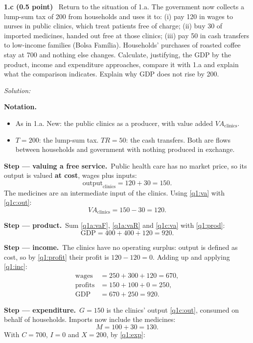 \documentclass[11pt,a4paper]{article}
\newif\ifsolucoes
\newcommand{\sub}[2]{\Needspace{8\baselineskip}\par\medskip\noindent\textbf{#1 (#2)}~}
\newcommand{\resolespaco}[1][6cm]{\ifsolucoes\else\par\textit{Solution:}\vspace{#1}\par\fi}
\newcommand{\passo}[2]{\par\smallskip\noindent\textbf{Step --- #1.}~#2}
\newenvironment{notacao}{\par\smallskip\noindent\textbf{Notation.}\begin{itemize}[leftmargin=1.4em,topsep=1pt,itemsep=0pt]\small}{\end{itemize}}
\begin{document}
\sub{1.c}{0.5 point} Return to the situation of 1.a. The government now collects a lump-sum tax
of 200 from households and uses it to: (i) pay 120 in wages to nurses in public clinics, which treat
patients free of charge; (ii) buy 30 of imported medicines, handed out free at those clinics;
(iii) pay 50 in cash transfers to low-income families (Bolsa Fam\'ilia). Households' purchases of
roasted coffee stay at 700 and nothing else changes. Calculate, justifying, the GDP by the product,
income and expenditure approaches, compare it with 1.a and explain what the comparison indicates.
Explain why GDP does not rise by 200.
\resolespaco[6.5cm]
\begin{sol}
\begin{notacao}
\item As in 1.a. New: the public clinics as a producer, with value added $VA_{\text{clinics}}$.
\item $T=200$: the lump-sum tax. $TR=50$: the cash transfers. Both are flows between households and
government with nothing produced in exchange.
\end{notacao}
\passo{valuing a free service}{Public health care has no market price, so its output is valued
\textbf{at cost}, wages plus inputs:}
\begin{equation}
\text{output}_{\text{clinics}}=120+30=150. \label{q1c:out}
\end{equation}
The medicines are an intermediate input of the clinics. Using \eqref{q1:va} with \eqref{q1c:out}:
\begin{equation}
VA_{\text{clinics}}=150-30=120. \label{q1c:va}
\end{equation}
\passo{product}{Sum \eqref{q1a:vaF}, \eqref{q1a:vaR} and \eqref{q1c:va} with \eqref{q1:prod}:}
\begin{equation}
\text{GDP}=400+400+120=\boxed{920}. \label{q1c:gdp}
\end{equation}
\passo{income}{The clinics have no operating surplus: output is defined as cost, so by
\eqref{q1:profit} their profit is $120-120=0$. Adding up and applying \eqref{q1:inc}:}
\begin{align*}
\text{wages} &= 250+300+120=670,\\
\text{profits} &= 150+100+0=250,\\
\text{GDP} &= 670+250=\boxed{920}.
\end{align*}
\passo{expenditure}{$G=150$ is the clinics' output \eqref{q1c:out}, consumed on behalf of
households. Imports now include the medicines:}
\[
M=100+30=130.
\]
With $C=700$, $I=0$ and $X=200$, by \eqref{q1:exp}:

\end{sol}
\end{document}
